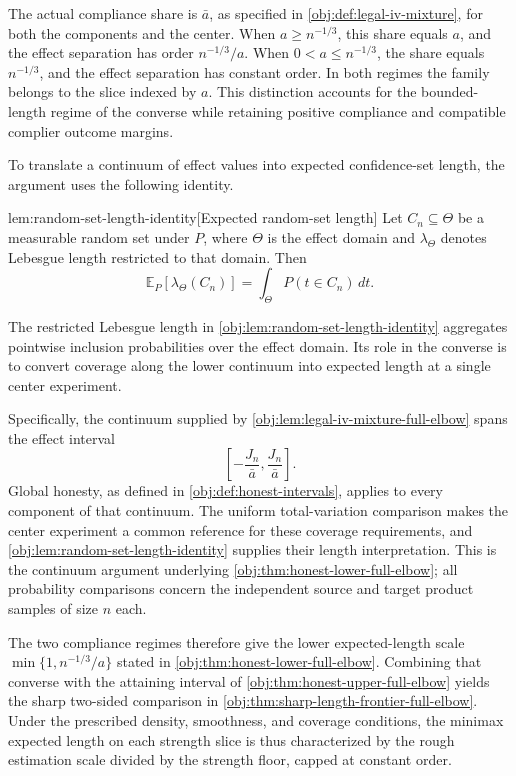 \documentclass[11pt]{article}
\begin{document}
The actual compliance share is \(\bar a\), as specified in \cref{obj:def:legal-iv-mixture}, for both the components and the center. When \(a\ge n^{-1/3}\), this share equals \(a\), and the effect separation has order \(n^{-1/3}/a\). When \(0<a\le n^{-1/3}\), the share equals \(n^{-1/3}\), and the effect separation has constant order. In both regimes the family belongs to the slice indexed by \(a\). This distinction accounts for the bounded-length regime of the converse while retaining positive compliance and compatible complier outcome margins.

To translate a continuum of effect values into expected confidence-set length, the argument uses the following identity.

\begin{lemmav}{lem:random-set-length-identity}[Expected random-set length]
Let \(C_n\subseteq\Theta\) be a measurable random set under \(P\), where \(\Theta\) is the effect domain and \(\lambda_{\Theta}\) denotes Lebesgue length restricted to that domain. Then
\[
\mathbb E_P\!\left[\lambda_{\Theta}(C_n)\right]
=
\int_{\Theta}P(t\in C_n)\,dt.
\]
\end{lemmav}

The restricted Lebesgue length  in \cref{obj:lem:random-set-length-identity} aggregates pointwise inclusion probabilities over the effect domain. Its role in the converse is to convert coverage along the lower continuum into expected length at a single center experiment.

Specifically, the continuum supplied by \cref{obj:lem:legal-iv-mixture-full-elbow} spans the effect interval
\[
\left[-\frac{J_n}{\bar a},\frac{J_n}{\bar a}\right].
\]
Global honesty, as defined in \cref{obj:def:honest-intervals}, applies to every component of that continuum. The uniform total-variation comparison makes the center experiment a common reference for these coverage requirements, and \cref{obj:lem:random-set-length-identity} supplies their length interpretation. This is the continuum argument underlying \cref{obj:thm:honest-lower-full-elbow}; all probability comparisons concern the independent source and target product samples of size \(n\) each.

The two compliance regimes therefore give the lower expected-length scale \(\min\{1,n^{-1/3}/a\}\) stated in \cref{obj:thm:honest-lower-full-elbow}. Combining that converse with the attaining interval of \cref{obj:thm:honest-upper-full-elbow} yields the sharp two-sided comparison in \cref{obj:thm:sharp-length-frontier-full-elbow}. Under the prescribed density, smoothness, and coverage conditions, the minimax expected length on each strength slice is thus characterized by the rough estimation scale divided by the strength floor, capped at constant order.
\end{document}
